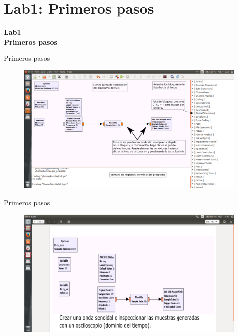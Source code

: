 

\section{Lab1: Primeros pasos}
\begin{frame}{}


\bfseries{\textrm{\LARGE Lab1\\ \Large Primeros pasos}}
\raggedright
\end{frame}

\begin{frame}{Primeros pasos}


\begin{figure}[H]
\centering
\includegraphics[width=\textwidth]{lab1/pdf/lab101.pdf}
\end{figure}
\end{frame}

\begin{frame}{Primeros pasos}
\begin{figure}[H]
\centering
\includegraphics[width=\textwidth]{lab1/pdf/lab102.pdf}
\end{figure}
\end{frame}


